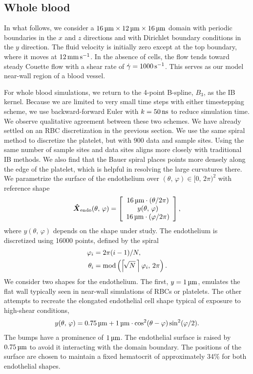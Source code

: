 \subsection{Whole blood}\label{sec:whole-blood}

In what follows, we consider a $16\um\times12\um\times16\um$ domain with periodic
boundaries in the $x$ and $z$ directions and with Dirichlet boundary conditions in the
$y$ direction. The fluid velocity is initially zero except at the top boundary, where it
moves at $12\mmpersec$. In the absence of cells, the flow tends toward steady Couette
flow with a shear rate of $\shear=1000\persec$. This serves as our model near-wall region
of a blood vessel.

For whole blood simulations, we return to the 4-point B-spline, $B_3$, as the IB kernel.
Because we are limited to very small time steps with either timestepping scheme, we use
backward-forward Euler with $\timestep=50\ns$ to reduce simulation time. We observe
qualitative agreement between these two schemes.  We have already settled on an RBC
discretization in the previous section. We use the same spiral method to discretize the
platelet, but with 900 data and sample sites. Using the same number of sample sites and
data sites aligns more closely with traditional IB methods. We also find that the Bauer
spiral places points more densely along the edge of the platelet, which is helpful in
resolving the large curvatures there. We parametrize the surface of the endothelium over
$(\theta,\,\varphi) \in [0,\,2\pi)^2$ with reference shape
\begin{equation}
    \vec{\hat{X}}_\text{endo}(\theta,\,\varphi) = \left[\begin{array}{c}
            16\um\cdot(\theta/2\pi)  \\
            y(\theta,\,\varphi) \\
            16\um\cdot(\varphi/2\pi)
    \end{array}\right],
\end{equation}
where $y(\theta,\,\varphi)$ depends on the shape under study. The endothelium is
discretized using 16000 points, defined by the spiral
\begin{align*}
    \varphi_i &= 2\pi (i-1)/N, \\
    \theta_i &= \modulo\left(\left\lceil\!\sqrt{N}\mskip\thinmuskip\right\rceil\varphi_i,\,2\pi\right).
\end{align*}
We consider two shapes for the endothelium. The first, $y=1\um$, emulates the flat wall
typically seen in near-wall simulations of RBCs or platelets. The other attempts to
recreate the elongated endothelial cell shape typical of exposure to high-shear
conditions,
\begin{equation*}
    y(\theta,\,\varphi) = 0.75\um + 1\um\cdot\cos^2(\theta-\varphi)\sin^2(\varphi/2).
\end{equation*}
The bumps have a prominence of $1\um$. The endothelial surface is raised by $0.75\um$ to
avoid it interacting with the domain boundary. The positions of the surface are chosen to
maintain a fixed hematocrit of approximately 34\% for both endothelial shapes.

